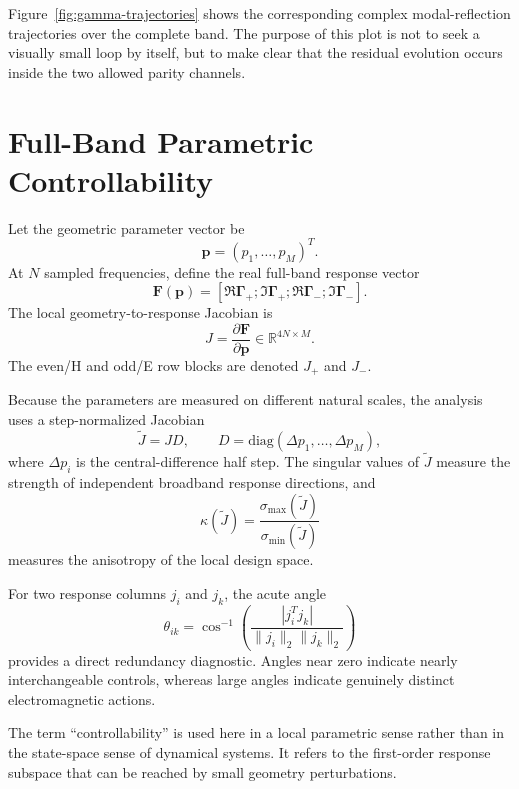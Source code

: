 \documentclass[journal]{IEEEtran}
\begin{document}
Figure~\ref{fig:gamma-trajectories} shows the corresponding complex modal-reflection trajectories over the complete band.  The purpose of this plot is not to seek a visually small loop by itself, but to make clear that the residual evolution occurs inside the two allowed parity channels.



\section{Full-Band Parametric Controllability}
Let the geometric parameter vector be
\begin{equation}
\bm p=(p_1,\ldots,p_M)^T.
\end{equation}
At $N$ sampled frequencies, define the real full-band response vector
\begin{equation}
\bm F(\bm p)=
[\Re\bm\Gamma_+;\Im\bm\Gamma_+;
 \Re\bm\Gamma_-;\Im\bm\Gamma_-].
\end{equation}
The local geometry-to-response Jacobian is
\begin{equation}
J=\frac{\partial\bm F}{\partial\bm p}
\in\mathbb R^{4N\times M}.
\end{equation}
The even/H and odd/E row blocks are denoted $J_+$ and $J_-$.

Because the parameters are measured on different natural scales, the analysis uses a step-normalized Jacobian
\begin{equation}
\widetilde J=JD,\qquad
D=\mathrm{diag}(\Delta p_1,\ldots,\Delta p_M),
\end{equation}
where $\Delta p_i$ is the central-difference half step.
The singular values of $\widetilde J$ measure the strength of independent broadband response directions, and
\begin{equation}
\kappa(\widetilde J)=
\frac{\sigma_{\max}(\widetilde J)}
{\sigma_{\min}(\widetilde J)}
\end{equation}
measures the anisotropy of the local design space.

For two response columns $j_i$ and $j_k$, the acute angle
\begin{equation}
\theta_{ik}
=\cos^{-1}\!\left(
\frac{|j_i^Tj_k|}{\|j_i\|_2\|j_k\|_2}
\right)
\end{equation}
provides a direct redundancy diagnostic.
Angles near zero indicate nearly interchangeable controls, whereas large angles indicate genuinely distinct electromagnetic actions.

The term ``controllability'' is used here in a local parametric sense rather than in the state-space sense of dynamical systems.
It refers to the first-order response subspace that can be reached by small geometry perturbations.
\end{document}
